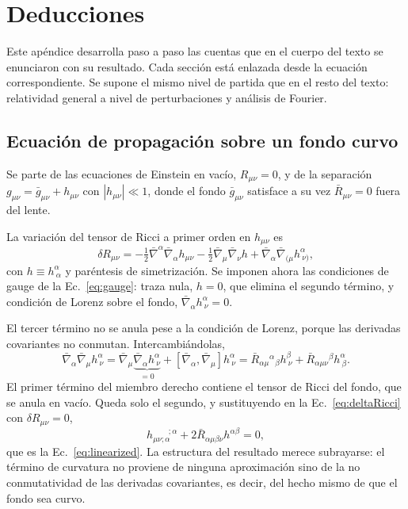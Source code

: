 \documentclass[11pt,a4paper,openany]{book}
\begin{document}
\appendix
\chapter{Deducciones}
\label{ap:deducciones}

Este ap\'endice desarrolla paso a paso las cuentas que en el cuerpo del texto
se enunciaron con su resultado. Cada secci\'on est\'a enlazada desde la
ecuaci\'on correspondiente. Se supone el mismo nivel de partida que en el
resto del texto: relatividad general a nivel de perturbaciones y an\'alisis de
Fourier.

\section{Ecuaci\'on de propagaci\'on sobre un fondo curvo}
\label{ap:linearized}

Se parte de las ecuaciones de Einstein en vac\'io, $R_{\mu\nu}=0$, y de la
separaci\'on $g_{\mu\nu}=\bar g_{\mu\nu}+h_{\mu\nu}$ con
$|h_{\mu\nu}|\ll1$, donde el fondo $\bar g_{\mu\nu}$ satisface a su vez
$\bar R_{\mu\nu}=0$ fuera del lente.

La variaci\'on del tensor de Ricci a primer orden en $h_{\mu\nu}$ es
\begin{equation}
  \delta R_{\mu\nu}=-\tfrac12\bar\nabla^{\alpha}\bar\nabla_{\alpha}h_{\mu\nu}
  -\tfrac12\bar\nabla_{\mu}\bar\nabla_{\nu}h
  +\bar\nabla_{\alpha}\bar\nabla_{(\mu}h^{\alpha}_{\ \nu)} ,
  \label{eq:deltaRicci}
\end{equation}
con $h\equiv h^{\alpha}_{\ \alpha}$ y par\'entesis de simetrizaci\'on. Se
imponen ahora las condiciones de gauge de la Ec.~\eqref{eq:gauge}: traza nula,
$h=0$, que elimina el segundo t\'ermino, y condici\'on de Lorenz sobre el
fondo, $\bar\nabla_{\alpha}h^{\alpha}_{\ \nu}=0$.

El tercer t\'ermino no se anula pese a la condici\'on de Lorenz, porque las
derivadas covariantes no conmutan. Intercambi\'andolas,
\begin{equation}
  \bar\nabla_{\alpha}\bar\nabla_{\mu}h^{\alpha}_{\ \nu}
  =\bar\nabla_{\mu}\underbrace{\bar\nabla_{\alpha}h^{\alpha}_{\ \nu}}_{=0}
  +\left[\bar\nabla_{\alpha},\bar\nabla_{\mu}\right]h^{\alpha}_{\ \nu}
  =\bar R_{\alpha\mu}{}^{\alpha}{}_{\beta}h^{\beta}_{\ \nu}
  +\bar R_{\alpha\mu\nu}{}^{\beta}h^{\alpha}_{\ \beta} .
  \label{eq:commutator}
\end{equation}
El primer t\'ermino del miembro derecho contiene el tensor de Ricci del fondo,
que se anula en vac\'io. Queda solo el segundo, y sustituyendo en la
Ec.~\eqref{eq:deltaRicci} con $\delta R_{\mu\nu}=0$,
\begin{equation}
  h_{\mu\nu;\alpha}^{\qquad;\alpha}+2\bar R_{\alpha\mu\beta\nu}h^{\alpha\beta}=0 ,
\end{equation}
que es la Ec.~\eqref{eq:linearized}. La estructura del resultado merece
subrayarse: el t\'ermino de curvatura no proviene de ninguna aproximaci\'on
sino de la no conmutatividad de las derivadas covariantes, es decir, del
hecho mismo de que el fondo sea curvo.
\end{document}
